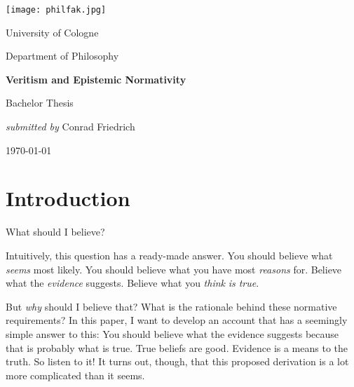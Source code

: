 \documentclass[12pt,numbers=noenddot]{scrartcl}
\begin{document}
\begin{titlepage}
    \centering
    \vspace{0.5cm}

    \texttt{[image: philfak.jpg]}
    \par\vspace{0.5cm}
    { \large University of Cologne \par}
    { \large Department of Philosophy \par}
    \vspace{0.5cm}
    \par\vspace{0.5cm}
    {\centering
        \vspace*{3cm} 
        {\Huge\osfamily\bfseries Veritism and Epistemic Normativity \par}
        \vspace{1cm}
    }
    \vspace{1cm}


    \vfill

    { \large Bachelor Thesis\par}
    { \large \emph{submitted by} Conrad Friedrich \par}
    { \large \today\par}



\end{titlepage}

\tableofcontents
\newpage

\section{Introduction}

\begin{center}
    \vspace*{2cm} 
    What should I believe?
    \vspace*{1cm} 
\end{center}

Intuitively, this question has a ready-made answer. You should believe what \emph{seems} most likely. You should believe what you have most \emph{reasons} for. Believe what the \emph{evidence} suggests. Believe what you \emph{think} \emph{is true}.

But \emph{why} should I believe that? What is the rationale behind these normative requirements? In this paper, I want to develop an account that has a seemingly simple answer to this: You should believe what the evidence suggests because that is probably what is true. True beliefs are good. Evidence is a means to the truth. So listen to it! It turns out, though, that this proposed derivation is a lot more complicated than it seems.
\end{document}
